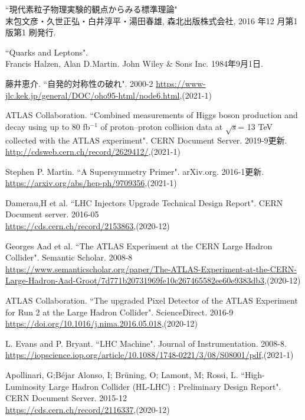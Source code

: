 \begin{thebibliography}{9}

``現代素粒子物理実験的観点からみる標準理論" \\
末包文彦・久世正弘・白井淳平・湯田春雄, 森北出版株式会社, 2016 年12 月第1 版第1 刷発行.

``Quarks and Leptons".\\
Francis Halzen, Alan D.Martin. John Wiley $\&$ Sons Inc. 1984年9月1日.

藤井恵介. ``自発的対称性の破れ". 2000-2
\url{https://www-jlc.kek.jp/general/DOC/oho95-html/node6.html},(2021-1)

ATLAS Collaboration. ``Combined measurements of Higgs boson production and decay using up to 80 fb${}^{−1}$ of proton--proton collision data at $\sqrt{s}$= 13 TeV collected with the ATLAS experiment". CERN Document Server. 2019-9更新.\\
\url{http://cdsweb.cern.ch/record/2629412/},(2021-1)

Stephen P. Martin. ``A Supersymmetry Primer". arXiv.org. 2016-1更新.\\
\url{https://arxiv.org/abs/hep-ph/9709356},(2021-1)

Damerau,H et al. ``LHC Injectors Upgrade Technical Design Report". CERN Document server. 2016-05\\
\url{https://cds.cern.ch/record/2153863},(2020-12)

Georges Aad et al. ``The ATLAS Experiment at the CERN Large Hadron Collider". Semantic Scholar. 2008-8\\
\url{https://www.semanticscholar.org/paper/The-ATLAS-Experiment-at-the-CERN-Large-Hadron-Aad-Groot/7d771b20731969fe10c267465582ee60e9383db3},(2020-12)

ATLAS Collaboration. ``The upgraded Pixel Detector of the ATLAS Experiment for Run 2 at the Large Hadron Collider". ScienceDirect. 2016-9\\
\url{https://doi.org/10.1016/j.nima.2016.05.018},(2020-12)

L. Evans and P. Bryant. ``LHC Machine". Journal of Instrumentation. 2008-8.\\
\url{https://iopscience.iop.org/article/10.1088/1748-0221/3/08/S08001/pdf},(2021-1)

Apollinari, G;Béjar Alonso, I; Brüning, O; Lamont, M; Rossi, L. ``High-Luminosity Large Hadron Collider (HL-LHC) : Preliminary Design Report". CERN Document Server. 2015-12\\
\url{https://cds.cern.ch/record/2116337},(2020-12)


\end{thebibliography}
